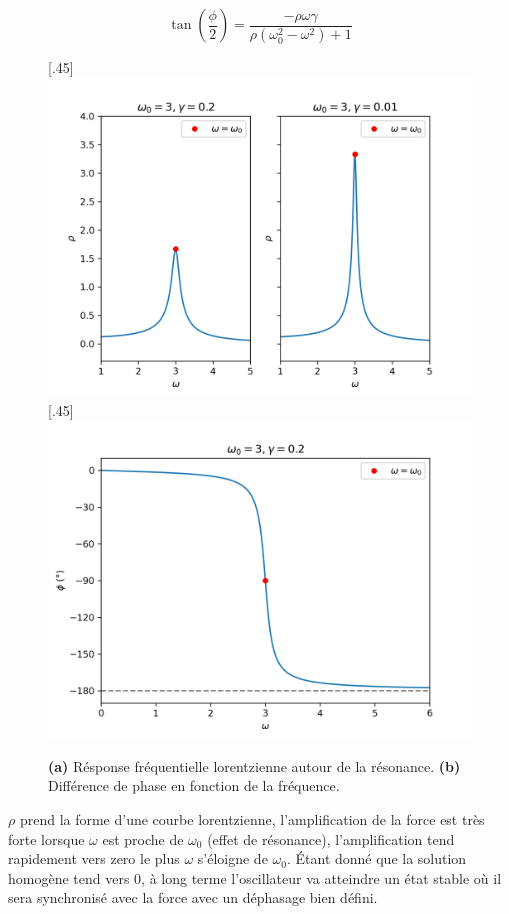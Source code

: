 \begin{dmath}
    \tan(\frac{\phi}{2}) = \frac{-\rho\omega\gamma}{\rho(\omega_0^2 - \omega^2) + 1}
\end{dmath}
%
\begin{figure}[!t]
    \centering
    \begin{subcaptionblock}{.90\linewidth}
        \subcaptionbox{}[.45\linewidth]{%
        \includegraphics[width=\linewidth]{images/harmonique/rho_plot_contrast.png}%
        }%
        \hfill
        \subcaptionbox{}[.45\linewidth]{%
        \includegraphics[width=\linewidth]{images/harmonique/frequency_phase_shift.png}%
        }
    \end{subcaptionblock}
    \caption{\textbf{(a)} Résponse fréquentielle lorentzienne autour de la résonance. \textbf{(b)} Différence de phase en fonction de la fréquence.}
\end{figure}
%
$\rho$ prend la forme d’une courbe lorentzienne, l’amplification 
de la force est très forte lorsque $\omega$ est proche de $\omega_0$ 
(effet de résonance), l’amplification tend rapidement vers zero 
le plus $\omega$ s’éloigne de $\omega_0$.
%
Étant donné que la solution homogène tend vers $0$, à long terme l'oscillateur va atteindre un état stable où il sera synchronisé avec la force
avec un déphasage bien défini.